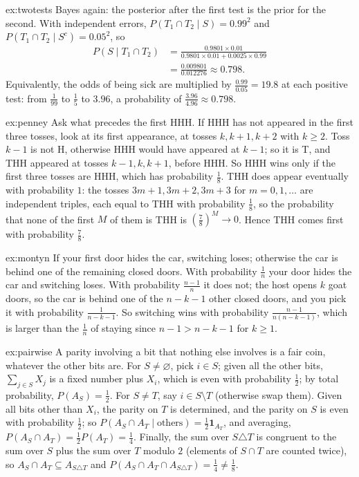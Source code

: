 \begin{solution}{ex:twotests}
\idea Bayes again: the posterior after the first test is the prior for the second.
\writeup With independent errors, $P(T_1\cap T_2\mid S)=0.99^2$ and $P(T_1\cap T_2\mid S^c)=0.05^2$, so
\[
\begin{aligned}P(S\mid T_1\cap T_2)&=\frac{0.9801\times0.01}{0.9801\times0.01+0.0025\times0.99}\\&=\frac{0.009801}{0.012276}\approx0.798.\end{aligned}
\]
Equivalently, the odds of being sick are multiplied by $\frac{0.99}{0.05}=19.8$ at each positive test: from $\frac1{99}$
to $\frac15$ to $3.96$, a probability of $\frac{3.96}{4.96}\approx0.798$.
\end{solution}

\begin{solution}{ex:penney}
\idea Ask what precedes the first HHH.
\writeup If HHH has not appeared in the first three tosses, look at its first appearance, at tosses
$k,k+1,k+2$ with $k\ge2$. Toss $k-1$ is not H, otherwise HHH would have appeared at $k-1$; so it is T, and THH
appeared at tosses $k-1,k,k+1$, before HHH. So HHH wins only if the first three tosses are HHH, which has
probability $\frac18$. THH does appear eventually with probability $1$: the tosses $3m+1,3m+2,3m+3$ for
$m=0,1,\ldots$ are independent triples, each equal to THH with probability $\frac18$, so the probability that none
of the first $M$ of them is THH is $(\frac78)^M\to0$. Hence THH comes first with probability $\frac78$.
\end{solution}

\begin{solution}{ex:montyn}
\idea If your first door hides the car, switching loses; otherwise the car is behind one of the remaining closed
doors.
\writeup With probability $\frac1n$ your door hides the car and switching loses. With probability $\frac{n-1}n$ it
does not; the host opens $k$ goat doors, so the car is behind one of the $n-k-1$ other closed doors, and you pick
it with probability $\frac1{n-k-1}$. So switching wins with probability $\frac{n-1}{n(n-k-1)}$, which is larger
than the $\frac1n$ of staying since $n-1>n-k-1$ for $k\ge1$.
\end{solution}

\begin{solution}{ex:pairwise}
\idea A parity involving a bit that nothing else involves is a fair coin, whatever the other bits are.
\writeup For $S\ne\varnothing$, pick $i\in S$; given all the other bits, $\sum_{j\in S}X_j$ is a fixed number plus
$X_i$, which is even with probability $\frac12$; by total probability, $P(A_S)=\frac12$. For $S\ne T$, say
$i\in S\setminus T$ (otherwise swap them). Given all bits other than $X_i$, the parity on $T$ is determined, and
the parity on $S$ is even with probability $\frac12$; so $P(A_S\cap A_T\mid\text{others})=\frac12\mathbf
1_{A_T}$, and averaging, $P(A_S\cap A_T)=\frac12P(A_T)=\frac14$. Finally, the sum over $S\triangle T$ is congruent
to the sum over $S$ plus the sum over $T$ modulo $2$ (elements of $S\cap T$ are counted twice), so $A_S\cap A_T\subseteq
A_{S\triangle T}$ and $P(A_S\cap A_T\cap A_{S\triangle T})=\frac14\ne\frac18$.
\end{solution}

